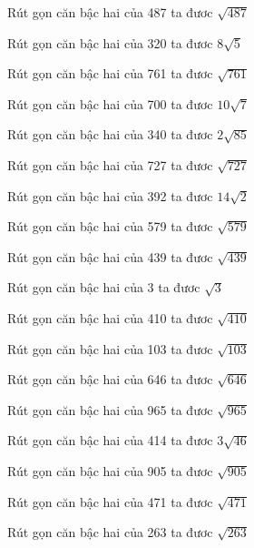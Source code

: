 \documentclass[12pt,a4paper]{article}
\begin{document}
\begin{ex}
Rút gọn căn bậc hai của 487 ta đươc $\sqrt{487}$
\end{ex}
\begin{ex}
Rút gọn căn bậc hai của 320 ta đươc $8\sqrt{5}$
\end{ex}
\begin{ex}
Rút gọn căn bậc hai của 761 ta đươc $\sqrt{761}$
\end{ex}
\begin{ex}
Rút gọn căn bậc hai của 700 ta đươc $10\sqrt{7}$
\end{ex}
\begin{ex}
Rút gọn căn bậc hai của 340 ta đươc $2\sqrt{85}$
\end{ex}
\begin{ex}
Rút gọn căn bậc hai của 727 ta đươc $\sqrt{727}$
\end{ex}
\begin{ex}
Rút gọn căn bậc hai của 392 ta đươc $14\sqrt{2}$
\end{ex}
\begin{ex}
Rút gọn căn bậc hai của 579 ta đươc $\sqrt{579}$
\end{ex}
\begin{ex}
Rút gọn căn bậc hai của 439 ta đươc $\sqrt{439}$
\end{ex}
\begin{ex}
Rút gọn căn bậc hai của 3 ta đươc $\sqrt{3}$
\end{ex}
\begin{ex}
Rút gọn căn bậc hai của 410 ta đươc $\sqrt{410}$
\end{ex}
\begin{ex}
Rút gọn căn bậc hai của 103 ta đươc $\sqrt{103}$
\end{ex}
\begin{ex}
Rút gọn căn bậc hai của 646 ta đươc $\sqrt{646}$
\end{ex}
\begin{ex}
Rút gọn căn bậc hai của 965 ta đươc $\sqrt{965}$
\end{ex}
\begin{ex}
Rút gọn căn bậc hai của 414 ta đươc $3\sqrt{46}$
\end{ex}
\begin{ex}
Rút gọn căn bậc hai của 905 ta đươc $\sqrt{905}$
\end{ex}
\begin{ex}
Rút gọn căn bậc hai của 471 ta đươc $\sqrt{471}$
\end{ex}
\begin{ex}
Rút gọn căn bậc hai của 263 ta đươc $\sqrt{263}$
\end{ex}
\end{document}
